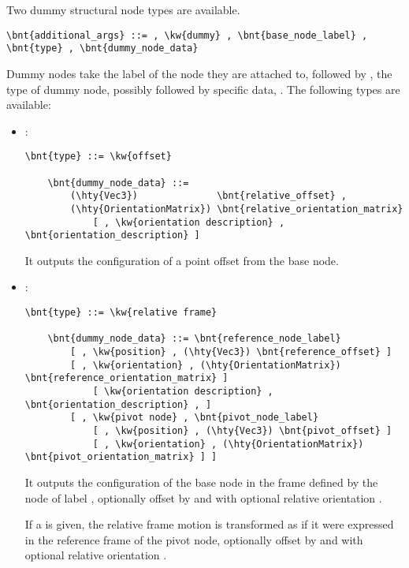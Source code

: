 Two dummy structural node types are available.
\begin{Verbatim}[commandchars=\\\{\}]
    \bnt{additional_args} ::= , \kw{dummy} , \bnt{base_node_label} , \bnt{type} , \bnt{dummy_node_data}
\end{Verbatim}

Dummy nodes take the label  of the node they are attached to, 
followed by , the type of dummy node, possibly followed by specific data,
.
The following types are available:

\begin{itemize}
    \item {}:
\begin{Verbatim}[commandchars=\\\{\}]
    \bnt{type} ::= \kw{offset}

    \bnt{dummy_node_data} ::=
        (\hty{Vec3})              \bnt{relative_offset} ,
        (\hty{OrientationMatrix}) \bnt{relative_orientation_matrix}
            [ , \kw{orientation description} , \bnt{orientation_description} ]
\end{Verbatim}
    It outputs the configuration of a point offset from the base node.
            
    \item {}:
\begin{Verbatim}[commandchars=\\\{\}]
    \bnt{type} ::= \kw{relative frame}

    \bnt{dummy_node_data} ::= \bnt{reference_node_label}
        [ , \kw{position} , (\hty{Vec3}) \bnt{reference_offset} ]
        [ , \kw{orientation} , (\hty{OrientationMatrix}) \bnt{reference_orientation_matrix} ]
            [ \kw{orientation description} , \bnt{orientation_description} , ]
        [ , \kw{pivot node} , \bnt{pivot_node_label}
            [ , \kw{position} , (\hty{Vec3}) \bnt{pivot_offset} ]
            [ , \kw{orientation} , (\hty{OrientationMatrix}) \bnt{pivot_orientation_matrix} ] ]
\end{Verbatim}
    It outputs the configuration of the base node in the frame defined
    by the node of label , optionally offset 
    by  and with optional relative orientation 
    .

    If a  is given, the relative frame motion
    is transformed as if it were expressed in the reference frame
    of the pivot node, optionally offset by 
    and with optional relative orientation .
\end{itemize}

